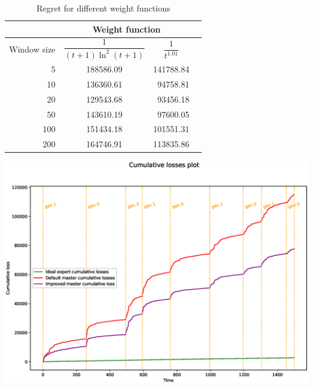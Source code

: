 \documentclass[12pt, twoside]{article}
\begin{document}
\begin{table}[h]
\centering

\begin{tabular}{r|ccc}

 &
\multicolumn{2}{c}{Weight function} \\

\toprule {Window size}  &
\centering $\dfrac{1}{(t+1)\ln^2(t+1)}$ &
\centering $\dfrac1{t^{1.01}}$  & \tabularnewline
\midrule
5 &  188586.09 & 141788.84 \\ %
10 &  136360.61 &\ 94758.81 \\ %
20 &  129543.68 &\ 93456.18 \\ %
50 &  143610.19 &\ 97600.05 \\ %
100 & 151434.18 & 101551.31 \\ %
200 & 164746.91 & 113835.86 \\ %
\bottomrule
\end{tabular}
\caption{Regret for different weight functions} \hspace{16cm}
\end{table}








\includegraphics[width=1\linewidth]{improvement3}
\end{document}
